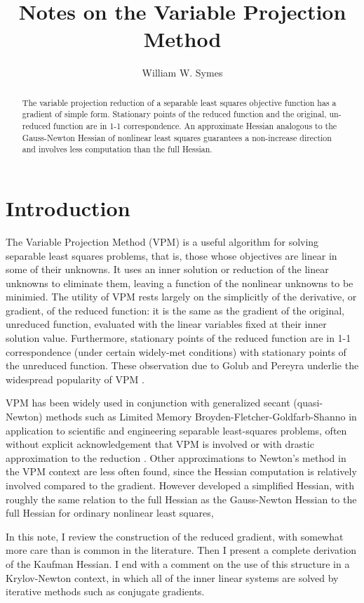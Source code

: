 \title{Notes on the Variable Projection Method}
\author{William W. Symes}

\begin{abstract}
The variable projection reduction of a separable least squares objective function has a gradient of simple form. Stationary points of the reduced function and the original, un-reduced function are in 1-1 correspondence. An approximate Hessian analogous to the Gauss-Newton Hessian of nonlinear least squares guarantees a non-increase direction and involves less computation than the full Hessian.
\end{abstract}

\section{Introduction}
The Variable Projection Method (VPM) is a useful algorithm for solving separable least squares problems, that is, those whose objectives are linear in some of their unknowns. It uses an inner solution or reduction of the linear unknowns to eliminate them, leaving a function of the nonlinear unknowns to be minimied. The utility of VPM rests largely on the simplicitly of the derivative, or gradient, of the reduced function: it is the same as the gradient of the original, unreduced function, evaluated with the linear variables fixed at their inner solution value. Furthermore, stationary points of the reduced function are in 1-1 correspondence (under certain widely-met conditions) with stationary points of the unreduced function. These observation due to Golub and Pereyra underlie the widespread popularity of VPM  \cite[]{GolubPereyra:73,GolubPereyra:03}.

VPM has been widely used in conjunction with generalized secant (quasi-Newton) methods such as Limited Memory Broyden-Fletcher-Goldfarb-Shanno \cite[]{NocedalWright} in application to scientific and engineering separable least-squares problems, often without explicit acknowledgement that VPM is involved or with drastic approximation to the reduction \cite[]{Ghattas:IP25,LeeuwenHerrmann:16,vanLeeuwenMulder:09,Warner:16}. Other approximations to Newton's method in the VPM context are less often found, since the Hessian computation is relatively involved compared to the gradient. However \cite{Kaufman:75} developed a simplified Hessian, with roughly the same relation to the full Hessian as the Gauss-Newton Hessian to the full Hessian for ordinary nonlinear least squares, 

In this note, I review the construction of the reduced gradient, with somewhat more care than is common in the literature. Then I present a complete derivation of the Kaufman Hessian. I end with a comment on the use of this structure in a Krylov-Newton context, in which all of the inner linear systems are solved by iterative methods such as conjugate gradients. 

